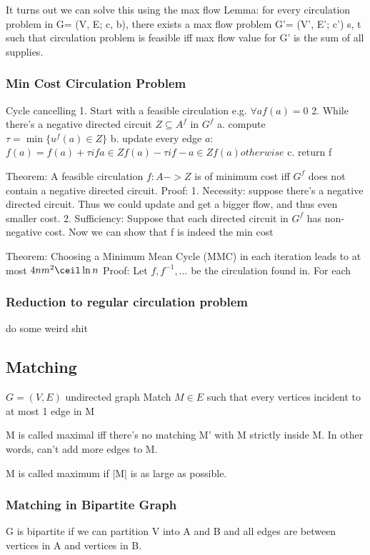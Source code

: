 \documentclass{article}
\begin{document}
It turns out we can solve this using the max flow
Lemma: for every circulation problem in G= (V, E; c, b), there exists a max flow
problem G'= (V', E'; c') s, t such that circulation problem is feasible iff max
flow value for G' is the sum of all supplies.


\subsubsection{Min Cost Circulation Problem}
Cycle cancelling
1. Start with a feasible circulation e.g. $\forall a f(a) = 0$
2. While there's a negative directed circuit $Z\subseteq A^f$ in $G^f$
   a. compute $\tau = \min \{u^f(a) \in Z\}$
   b. update every edge $a$: $f(a) = f(a) + \tau if a \in Z f(a) - \tau if -a \in Z f(a) otherwise$
   c. return f

Theorem: A feasible circulation $f: A -> Z$ is of minimum cost iff
$G^f$ does not contain a negative directed circuit.
Proof:
1. Necessity: suppose there's a negative directed circuit. Thus we
could update and get a bigger flow, and thus even smaller cost.
2. Sufficiency: Suppose that each directed circuit in $G^f$ has non-negative cost.  Now we can show that f is indeed the min cost

Theorem: Choosing a Minimum Mean Cycle (MMC) in each iteration leads to at most $4nm^2\ceil \ln n$
Proof:
Let $f, f^{-1},\ldots$ be the circulation found in.  For each 

\subsubsection{Reduction to regular circulation problem}
do some weird shit



\subsection{Matching}
$G=(V,E)$ undirected graph
Match $M\in E$ such that every vertices incident to at most 1 edge in M

M is called maximal iff there's no matching M' with M strictly inside M.  In
other words, can't add more edges to M.

M is called maximum if |M| is as large as possible.

\subsubsection{Matching in Bipartite Graph}
G is bipartite if we can partition V into A and B and all edges are between
vertices in A and vertices in B.
\end{document}
